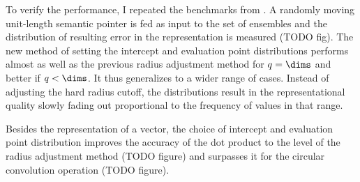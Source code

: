 To verify the performance, I repeated the benchmarks from \textcite{gosmann216}\@.
A randomly moving unit-length semantic pointer is fed as input to the set of ensembles and the distribution of resulting error in the representation is measured (TODO fig).
The new method of setting the intercept and evaluation point distributions performs almost as well as the previous radius adjustment method for $q = \dims$ and better if $q < \dims$.
It thus generalizes to a wider range of cases.
Instead of adjusting the hard radius cutoff, the distributions result in the representational quality slowly fading out proportional to the frequency of values in that range.

Besides the representation of a vector, the choice of intercept and evaluation point distribution improves the accuracy of the dot product to the level of the radius adjustment method (TODO figure) and surpasses it for the circular convolution operation (TODO figure).
